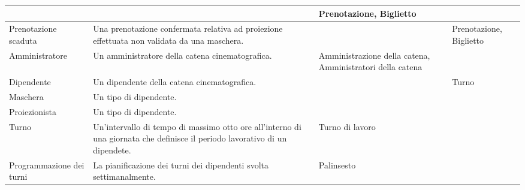 \begin{longtable}{|p{3.86cm}|p{3.86cm}|p{3.86cm}|p{3.86cm}|}
       &
       & Prenotazione, Biglietto
      \\ \hline
      Prenotazione scaduta
       & Una prenotazione confermata relativa ad proiezione effettuata
      non validata da una maschera.
       &
       & Prenotazione, Biglietto
      \\ \hline
      Amministratore
       & Un amministratore della catena cinematografica.
       & Amministrazione della catena, Amministratori della catena
       &
      \\ \hline
      Dipendente
       & Un dipendente della catena cinematografica.
       &
       & Turno
      \\ \hline
      Maschera
       & Un tipo di dipendente.
       &
       &
      \\ \hline
      Proiezionista
       & Un tipo di dipendente.
       &
       &
      \\ \hline
      Turno
       & Un'intervallo di tempo di massimo otto ore all'interno di una giornata
      che definisce il periodo lavorativo di un dipendete.
       & Turno di lavoro
       &
      \\ \hline
      Programmazione dei turni
       & La pianificazione dei turni dei dipendenti svolta settimanalmente.
       & Palinsesto
       &
      \\ \hline
\end{longtable}

\pagebreak

